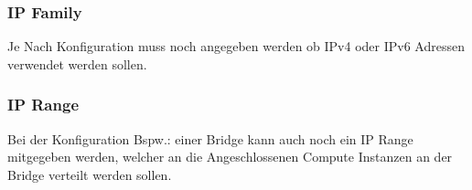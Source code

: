 \subsubsection{IP Family}
Je Nach  Konfiguration muss noch angegeben werden ob IPv4 oder IPv6 Adressen 
verwendet werden sollen.

\subsubsection{IP Range}
Bei der Konfiguration Bspw.: einer Bridge kann auch noch ein IP Range mitgegeben 
werden, welcher an die Angeschlossenen Compute Instanzen an der Bridge verteilt 
werden sollen.

